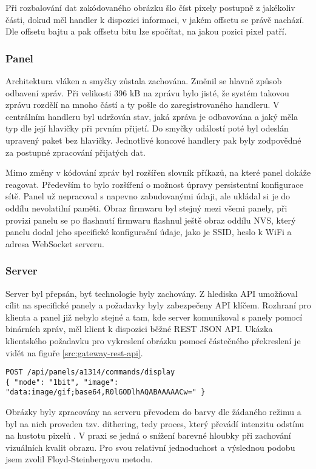 Při rozbalování dat zakódovaného obrázku šlo číst pixely postupně z jakékoliv části, dokud měl handler k dispozici informaci, v jakém offsetu se právě nachází. Dle offsetu bajtu a pak offsetu bitu lze spočítat, na jakou pozici pixel patří.

\subsubsection{Panel}
Architektura vláken a smyčky zůstala zachována. Změnil se hlavně způsob odbavení zpráv. Při velikosti 396 kB na zprávu bylo jisté, že systém takovou zprávu rozdělí na mnoho částí a ty pošle do zaregistrovaného handleru. V centrálním handleru byl udržován stav, jaká zpráva je odbavována a jaký měla typ dle její hlavičky při prvním přijetí. Do smyčky událostí poté byl odeslán upravený paket bez hlavičky. Jednotlivé koncové handlery pak byly zodpovědné za postupné zpracování přijatých dat.

Mimo změny v kódování zpráv byl rozšířen slovník příkazů, na které panel dokáže reagovat. Především to bylo rozšíření o možnost úpravy persistentní konfigurace sítě. Panel už nepracoval s napevno zabudovanými údaji, ale ukládal si je do oddílu nevolatilní paměti. Obraz firmwaru byl stejný mezi všemi panely, při provizi panelu se po flashnutí firmwaru flashnul ještě obraz oddílu NVS, který panelu dodal jeho specifické konfigurační údaje, jako je SSID, heslo k WiFi a adresa WebSocket serveru.

\subsubsection{Server}
Server byl přepsán, byť technologie byly zachovány. Z hlediska API umožňoval cílit na specifické panely a požadavky byly zabezpečeny API klíčem. Rozhraní pro klienta a panel již nebylo stejné a tam, kde server komunikoval s panely pomocí binárních zpráv, měl klient k dispozici běžné REST JSON API. Ukázka klientského požadavku pro vykreslení obrázku pomocí částečného překreslení je vidět na figuře \ref{src:gateway-rest-api}.

\begin{lstlisting}[label=src:gateway-rest-api,caption={Požadavek na server pro částečné překreslení obrázku ve verzi Birnárních zpráv}]
POST /api/panels/a1314/commands/display
{ "mode": "1bit", "image": "data:image/gif;base64,R0lGODlhAQABAAAAACw=" }
\end{lstlisting}

Obrázky byly zpracovány na serveru převodem do barvy dle žádaného režimu a byl na nich proveden tzv. dithering, tedy proces, který převádí intenzitu odstínu na hustotu pixelů \cite{Dithering}. V praxi se jedná o snížení barevné hloubky při zachování vizuálních kvalit obrazu. Pro svou relativní jednoduchost a výslednou podobu jsem zvolil Floyd-Steinbergovu metodu\cite{knuthDigitalHalftonesDot1987}\cite{hellandImageDitheringEleven2012}.

